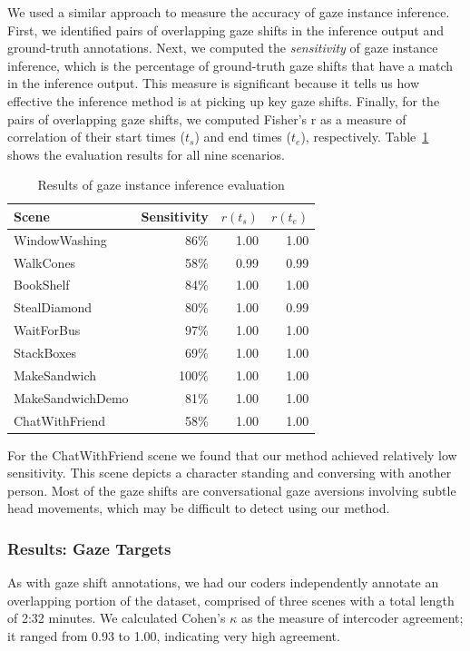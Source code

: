 We used a similar approach to measure the accuracy of gaze instance inference. First, we identified pairs of overlapping gaze shifts in the inference output and ground-truth annotations. Next, we computed the \emph{sensitivity} of gaze instance inference, which is the percentage of ground-truth gaze shifts that have a match in the inference output. This measure is significant because it tells us how effective the inference method is at picking up key gaze shifts. Finally, for the pairs of overlapping gaze shifts, we computed Fisher's r as a measure of correlation of their start times ($t_s$) and end times ($t_e$), respectively. Table~\ref{tab:GazeShiftInferenceResults} shows the evaluation results for all nine scenarios.

\begin{table}
\small
\centering
\def\arraystretch{1.5}
\begin{tabular}{lrrr}
\hline
\textbf{Scene} & \textbf{Sensitivity} & $r(t_s)$ & $r(t_e)$ \\
\hline
WindowWashing & 86\% & 1.00 & 1.00 \\
WalkCones & 58\% & 0.99 & 0.99 \\
BookShelf & 84\% & 1.00 & 1.00 \\
StealDiamond & 80\% & 1.00 & 0.99 \\
WaitForBus & 97\% & 1.00 & 1.00 \\
StackBoxes & 69\% & 1.00 & 1.00 \\
MakeSandwich & 100\% & 1.00 & 1.00 \\
MakeSandwichDemo & 81\% & 1.00 & 1.00 \\
ChatWithFriend & 58\% & 1.00 & 1.00 \\
\hline
\end{tabular}
\caption{Results of gaze instance inference evaluation}
\label{tab:GazeShiftInferenceResults}
\end{table}

For the ChatWithFriend scene we found that our method achieved relatively low sensitivity. This scene depicts a character standing and conversing with another person. Most of the gaze shifts are conversational gaze aversions involving subtle head movements, which may be difficult to detect using our method.

\subsubsection{Results: Gaze Targets}

As with gaze shift annotations, we had our coders independently annotate an overlapping portion of the dataset, comprised of three scenes with a total length of 2:32 minutes. We calculated Cohen's $\kappa$ as the measure of intercoder agreement; it ranged from 0.93 to 1.00, indicating very high agreement.

